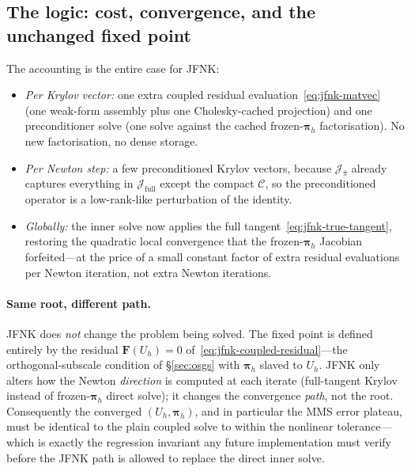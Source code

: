 \documentclass{article}
\begin{document}
\subsection{The logic: cost, convergence, and the unchanged fixed point}
\label{sec:jfnk-logic}

The accounting is the entire case for JFNK:
\begin{itemize}
\item \emph{Per Krylov vector:} one extra coupled residual
evaluation~\eqref{eq:jfnk-matvec} (one weak-form assembly plus one
Cholesky-cached projection) and one preconditioner solve (one solve
against the cached frozen-$\boldsymbol{\pi}_h$ factorisation). No new
factorisation, no dense storage.
\item \emph{Per Newton step:} a few preconditioned Krylov vectors,
because $\mathcal{J}_{\bar\pi}$ already captures everything in
$\mathcal{J}_{\mathrm{full}}$ except the compact $\mathcal{C}$, so the
preconditioned operator is a low-rank-like perturbation of the identity.
\item \emph{Globally:} the inner solve now applies the full
tangent~\eqref{eq:jfnk-true-tangent}, restoring the quadratic local
convergence that the frozen-$\boldsymbol{\pi}_h$ Jacobian forfeited---at
the price of a small constant factor of extra residual evaluations per
Newton iteration, not extra Newton iterations.
\end{itemize}

\paragraph{Same root, different path.}  JFNK does \emph{not} change the
problem being solved. The fixed point is defined entirely by the
residual $\boldsymbol{F}(U_h) = 0$
of~\eqref{eq:jfnk-coupled-residual}---the orthogonal-subscale
condition of §\ref{sec:osgs} with $\boldsymbol{\pi}_h$ slaved to
$U_h$. JFNK only alters how the Newton \emph{direction} is computed at
each iterate (full-tangent Krylov instead of frozen-$\boldsymbol{\pi}_h$
direct solve); it changes the convergence \emph{path}, not the root.
Consequently the converged $(U_h, \boldsymbol{\pi}_h)$, and in particular
the MMS error plateau, must be identical to the plain coupled solve to
within the nonlinear tolerance---which is exactly the regression invariant
any future implementation must verify before the JFNK path is allowed to
replace the direct inner solve.
\end{document}
